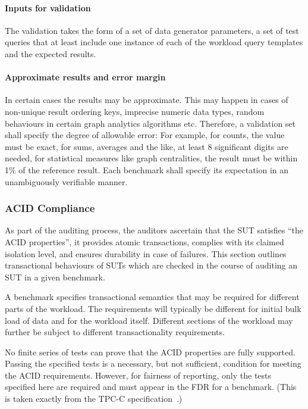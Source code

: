 \paragraph{Inputs for validation}
The validation takes the form of a set of data generator parameters, a set of test queries that at least include one instance of each of the workload query templates and the expected results.

\paragraph{Approximate results and error margin}
In certain cases the results may be approximate. This may happen in cases of non-unique result ordering keys, imprecise numeric data types, random behaviours in certain graph analytics algorithms etc. Therefore, a validation set shall specify the degree of allowable error: For example, for counts, the value must be exact, for sums, averages and the like, at least 8 significant digits are needed, for statistical measures like graph centralities, the result must be within 1\% of the reference result. Each benchmark shall specify its expectation in an unambiguously verifiable manner.


\subsubsection{ACID Compliance}

As part of the auditing process, the auditors ascertain that the SUT satisfies ``the ACID properties'', \ie it provides atomic transactions, complies with its claimed isolation level, and ensures durability in case of failures.
This section outlines transactional behaviours of SUTs which are checked in the course of auditing an SUT in a given benchmark.

A benchmark specifies transactional semantics that may be required for different parts of the workload. The requirements will typically be different for initial bulk load of data and for the workload itself. Different sections of the workload may further be subject to different transactionality requirements.

No finite series of tests can prove that the ACID properties are fully supported. Passing the specified tests is a necessary, but not sufficient, condition for meeting the ACID requirements. However, for fairness of reporting, only the tests specified here are required and must appear in the FDR for a benchmark. (This is taken exactly from the \mbox{TPC-C} specification~\cite{tpcc}.)

